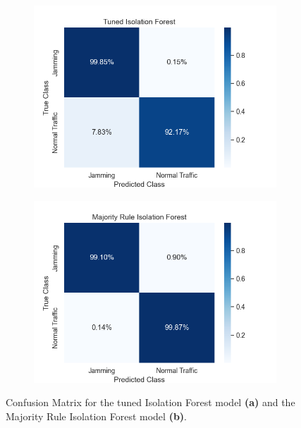 \documentclass[futureinternet,article,submit,pdftex,moreauthors]{Definitions/mdpi}
\begin{document}
\begin{figure}[H]
	\centering
	\begin{subfigure}{0.49\textwidth}
		\centering
		\includegraphics[width=\textwidth]{img/ConfusionMatrixTunedIF.png}
		\caption{}
		\label{fig:ConfusionMatrixStandardTunedIF1}
	\end{subfigure}
	\hfill
	\begin{subfigure}{0.49\textwidth}
		\centering
		\includegraphics[width=\textwidth]{img/ConfusionMatrixMajorityIF.png}
		\caption{}
		\label{fig:ConfusionMatrixMajorityIF}
	\end{subfigure}
	\caption{Confusion Matrix for the tuned Isolation Forest model \textbf{(a)} and the Majority Rule Isolation Forest model \textbf{(b)}.}
	\label{fig:ConfusionMatrixTunedMajorityIF}
\end{figure}
\end{document}
